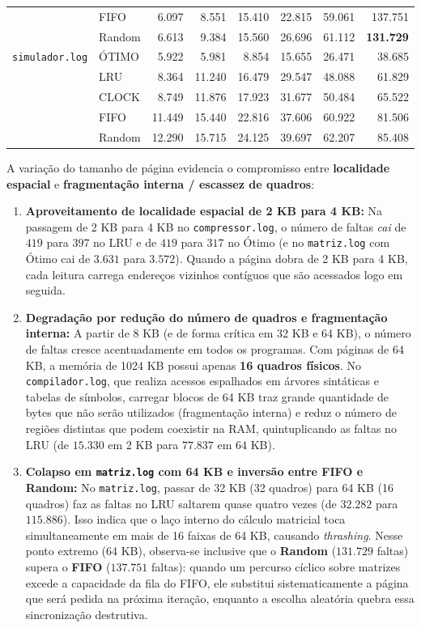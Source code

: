 \documentclass[12pt,a4paper]{article}
\begin{document}
\begin{table}[H]
{\begin{tabular}{llrrrrrr}
                        & FIFO   & 6.097  & 8.551  & 15.410 & 22.815 & 59.061 & 137.751 \\
                        & Random & 6.613  & 9.384  & 15.560 & 26.696 & 61.112 & \textbf{131.729} \\
\midrule
\texttt{simulador.log}  & ÓTIMO  & 5.922  & 5.981  & 8.854  & 15.655 & 26.471 & 38.685  \\
                        & LRU    & 8.364  & 11.240 & 16.479 & 29.547 & 48.088 & 61.829  \\
                        & CLOCK  & 8.749  & 11.876 & 17.923 & 31.677 & 50.484 & 65.522  \\
                        & FIFO   & 11.449 & 15.440 & 22.816 & 37.606 & 60.922 & 81.506  \\
                        & Random & 12.290 & 15.715 & 24.125 & 39.697 & 62.207 & 85.408  \\
\bottomrule
\end{tabular}%
}
\end{table}

A variação do tamanho de página evidencia o compromisso entre \textbf{localidade espacial} e \textbf{fragmentação interna / escassez de quadros}:
\begin{enumerate}
    \item \textbf{Aproveitamento de localidade espacial de 2 KB para 4 KB:} Na passagem de 2 KB para 4 KB no \texttt{compressor.log}, o número de faltas \textit{cai} de $419$ para $397$ no LRU e de $419$ para $317$ no Ótimo (e no \texttt{matriz.log} com Ótimo cai de $3.631$ para $3.572$). Quando a página dobra de 2 KB para 4 KB, cada leitura carrega endereços vizinhos contíguos que são acessados logo em seguida.
    \item \textbf{Degradação por redução do número de quadros e fragmentação interna:} A partir de 8 KB (e de forma crítica em 32 KB e 64 KB), o número de faltas cresce acentuadamente em todos os programas. Com páginas de 64 KB, a memória de 1024 KB possui apenas \textbf{16 quadros físicos}. No \texttt{compilador.log}, que realiza acessos espalhados em árvores sintáticas e tabelas de símbolos, carregar blocos de 64 KB traz grande quantidade de bytes que não serão utilizados (fragmentação interna) e reduz o número de regiões distintas que podem coexistir na RAM, quintuplicando as faltas no LRU (de $15.330$ em 2 KB para $77.837$ em 64 KB).
    \item \textbf{Colapso em \texttt{matriz.log} com 64 KB e inversão entre FIFO e Random:} No \texttt{matriz.log}, passar de 32 KB (32 quadros) para 64 KB (16 quadros) faz as faltas no LRU saltarem quase quatro vezes (de $32.282$ para $115.886$). Isso indica que o laço interno do cálculo matricial toca simultaneamente em mais de 16 faixas de 64 KB, causando \textit{thrashing}. Nesse ponto extremo (64 KB), observa-se inclusive que o \textbf{Random} ($131.729$ faltas) supera o \textbf{FIFO} ($137.751$ faltas): quando um percurso cíclico sobre matrizes excede a capacidade da fila do FIFO, ele substitui sistematicamente a página que será pedida na próxima iteração, enquanto a escolha aleatória quebra essa sincronização destrutiva.
\end{enumerate}
\end{document}
